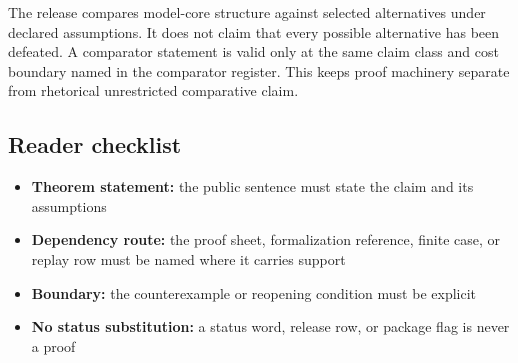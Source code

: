 The release compares model-core structure against selected alternatives under declared assumptions. It does not claim that every possible alternative has been defeated. A comparator statement is valid only at the same claim class and cost boundary named in the comparator register. This keeps proof machinery separate from rhetorical unrestricted comparative claim.


\subsection{Reader checklist}

\begin{itemize}[leftmargin=1.8em]

\item \textbf{Theorem statement:} the public sentence must state the claim and its assumptions

\item \textbf{Dependency route:} the proof sheet, formalization reference, finite case, or replay row must be named where it carries support

\item \textbf{Boundary:} the counterexample or reopening condition must be explicit

\item \textbf{No status substitution:} a status word, release row, or package flag is never a proof

\end{itemize}
